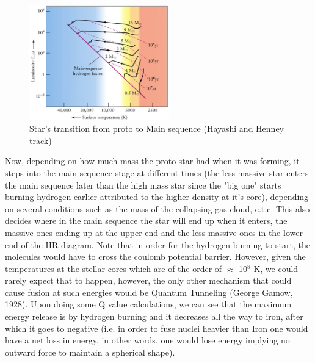 \documentclass[a4paper,twoside]{report}
\numberwithin{equation}{section}
\begin{document}
\paragraph{}
\begin{figure}
\includegraphics[width=1.0\linewidth, height=5cm]{HR_Diagram.jpg}
\caption{Star's transition from proto to Main sequence (Hayashi and Henney track)}
\label{Hayashi and henney track}
\end{figure} 
Now, depending on how much mass the proto star had when it was forming, it steps into the main sequence stage at different times (the less massive star enters the main sequence later than the high mass star since the "big one" starts burning hydrogen earlier attributed to the higher density at it's core), depending on several conditions such as the mass of the collapsing gas cloud, e.t.c. This also decides where in the main sequence the star will end up when it enters, the massive ones ending up at the upper end and the less massive ones in the lower end of the HR diagram. Note that in order for the hydrogen burning to start, the molecules would have to cross the coulomb potential barrier. However, given the temperatures at the stellar cores which are of the order of $\approx$ 10$^8$ K, we could rarely expect that to happen, however, the only other mechanism that could cause fusion at such energies would be Quantum Tunneling (George Gamow, 1928). Upon doing some Q value calculations, we can see that the maximum energy release is by hydrogen burning and it decreases all the way to iron, after which it goes to negative (i.e. in order to fuse nuclei heavier than Iron one would have a net loss in energy, in other words, one would lose energy implying no outward force to maintain a spherical shape).
\end{document}
